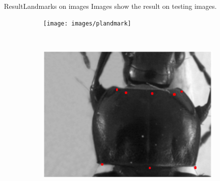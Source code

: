 \documentclass[10pt]{beamer}
\begin{document}
\begin{frame}{Result}{Landmarks on images}
Images show the result on testing images.
\begin{figure}[htbp]
   				\begin{subfigure}[t]{0.5\textwidth}
        			\centering
        			\texttt{[image: images/plandmark]}
        			\caption{ }
        			\label{figsub11}
    			\end{subfigure}%
    			~ 
    			\begin{subfigure}[t]{0.5\textwidth}
        			\centering
        			\includegraphics[scale=.2]{images/plandmark2}
        			\caption{ }
        			\label{figsub22}
    			\end{subfigure}    		
			\end{figure}
\end{frame}
\end{document}
